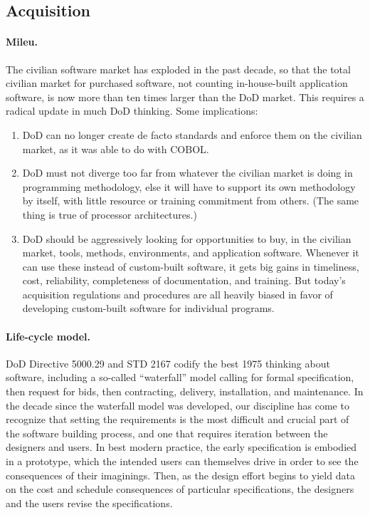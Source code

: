 \documentclass[11pt,final]{article}
\begin{document}
\subsection*{Acquisition}

\paragraph{Mileu.} The civilian software market has exploded in the past decade, so that the total
civilian market for purchased software, not counting in-house-built application software, is
now more than ten times larger than the DoD market. This requires a radical update in
much DoD thinking. Some implications:

\begin{enumerate}
\item DoD can no longer create de facto standards and enforce them on the civilian market,
as it was able to do with COBOL.

\item DoD must not diverge too far from whatever the civilian market is doing in programming methodology, else it will have to support its own methodology by itself, with little
resource or training commitment from others. (The same thing is true of processor
architectures.)

\item DoD should be aggressively looking for opportunities to buy, in the civilian market,
tools, methods, environments, and application software. Whenever it can use these
instead of custom-built software, it gets big gains in timeliness, cost, reliability,
completeness of documentation, and training. But today’s acquisition regulations
and procedures are all heavily biased in favor of developing custom-built software
for individual programs.
\end{enumerate}

\paragraph{Life-cycle model.} DoD Directive 5000.29 and STD 2167 codify the
best 1975 thinking about software, including a so-called “waterfall” model
calling for formal specification, then request for bids, then contracting,
delivery, installation, and maintenance. In the decade since the waterfall
model was developed, our discipline has come to recognize that setting the
requirements is the most difficult and crucial part of the software building
process, and one that requires iteration between the designers and users. In
best modern practice, the early specification is embodied in a prototype, which
the intended users can themselves drive in order to see the consequences of
their imaginings. Then, as the design effort begins to yield data on the cost
and schedule consequences of particular specifications, the designers and the
users revise the specifications.
\end{document}
